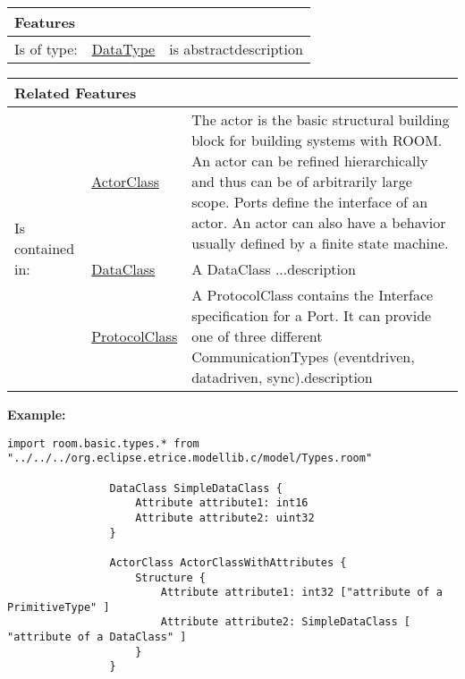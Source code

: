 			\begingroup
			\renewcommand{\arraystretch}{1.8} %
			\begin{longtable}{p{2.5cm}|p{4cm} p{}}
				\multicolumn{2}{l}{\textbf{\large Features}} & \\
				\hline
			Is of type: & \tabitem \hyperlink{ref:DataType}{DataType}  & is abstractdescription\\
			\hline
			\end{longtable}
			\endgroup
			
			\begingroup
			\renewcommand{\arraystretch}{1.8} %
			\begin{longtable}{p{2.5cm}|p{4cm} p{}}
				\multicolumn{2}{l}{\textbf{\large Related Features}} & \\
				\hline
			\multirow{3}{*}{Is contained in:} & \tabitem \hyperlink{ref:ActorClass}{ActorClass}  & The actor is the basic structural building block for building systems with ROOM. An actor can be refined hierarchically and thus can be of arbitrarily large scope. Ports define the interface of an actor. An actor can also have a behavior usually defined by a finite state machine. \\
			& \tabitem \hyperlink{ref:DataClass}{DataClass}  & A DataClass ...description  \\
			& \tabitem \hyperlink{ref:ProtocolClass}{ProtocolClass}  & A ProtocolClass contains the Interface specification for a Port. It can provide one of three different CommunicationTypes (eventdriven, datadriven, sync).description  \\
			\hline
			\end{longtable}
			\endgroup
			
			
			\textbf{Example:} 
				\begin{lstlisting}[language=ROOM]
				import room.basic.types.* from "../../../org.eclipse.etrice.modellib.c/model/Types.room"
				
				DataClass SimpleDataClass {
					Attribute attribute1: int16
					Attribute attribute2: uint32
				}
				
				ActorClass ActorClassWithAttributes {
					Structure {
						Attribute attribute1: int32 ["attribute of a PrimitiveType" ]
						Attribute attribute2: SimpleDataClass [ "attribute of a DataClass" ]
					}
				}
				\end{lstlisting}
		
		\vspace{\baselineskip}
		\vspace{\baselineskip}
		\vspace{\baselineskip}
		
